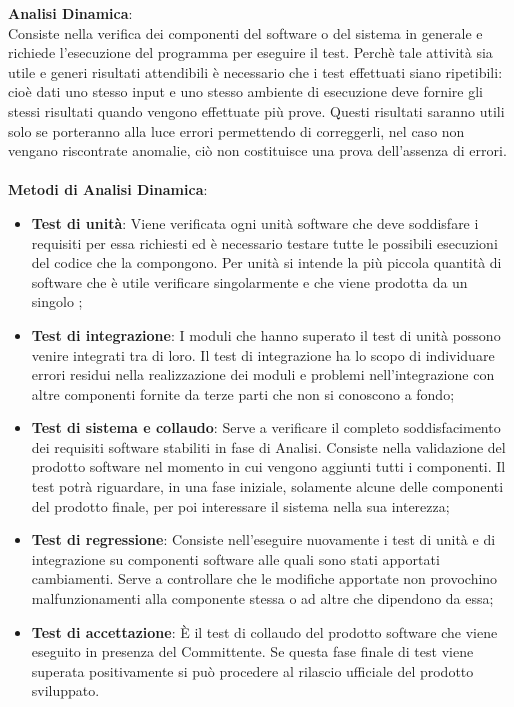 \textbf{Analisi Dinamica}:\medskip \\
Consiste nella verifica dei componenti del software o del sistema in generale e richiede l'esecuzione del programma per eseguire il test.
Perchè tale attività sia utile e generi risultati attendibili è necessario che i test effettuati siano ripetibili: cioè dati uno stesso input e uno stesso ambiente di esecuzione deve fornire gli stessi risultati quando vengono effettuate più prove. Questi risultati saranno utili solo se porteranno alla luce errori permettendo di correggerli, nel caso non vengano riscontrate anomalie, ciò non costituisce una prova dell'assenza di errori.
\\ \\ \textbf{Metodi di Analisi Dinamica}:
\begin{itemize}
	\item \textbf{Test di unità}:
	Viene verificata ogni unità software che deve soddisfare i requisiti per essa richiesti ed è necessario testare tutte le possibili esecuzioni del codice che la compongono. Per unità si intende la più piccola quantità di software che è utile verificare singolarmente e che viene prodotta da un singolo \ruoloProgrammatore;
	\item \textbf{Test di integrazione}:
	I moduli che hanno superato il test di unità possono
	venire integrati tra di loro. Il test di integrazione ha lo scopo di individuare errori residui nella realizzazione dei moduli e problemi nell'integrazione con altre componenti fornite da terze parti che non si conoscono a fondo;
	\item \textbf{Test di sistema e collaudo}:
	Serve a verificare il completo soddisfacimento dei requisiti software stabiliti in fase di Analisi. Consiste nella validazione del prodotto software nel momento in cui vengono aggiunti tutti i componenti. Il test potrà riguardare, in una fase iniziale, solamente alcune delle componenti del prodotto finale, per poi interessare il sistema nella sua interezza;
	\item \textbf{Test di regressione}:
	Consiste nell'eseguire nuovamente i test di unità e di integrazione su componenti software alle quali sono stati apportati cambiamenti. Serve a  controllare che le modifiche apportate non provochino malfunzionamenti alla componente stessa o ad altre che dipendono da essa;
	\item \textbf{Test di accettazione}:
	È il test di collaudo del prodotto software che viene eseguito in presenza del Committente. Se questa fase finale di test viene superata positivamente si può procedere al rilascio ufficiale del prodotto sviluppato.
\end{itemize}
\newpage
